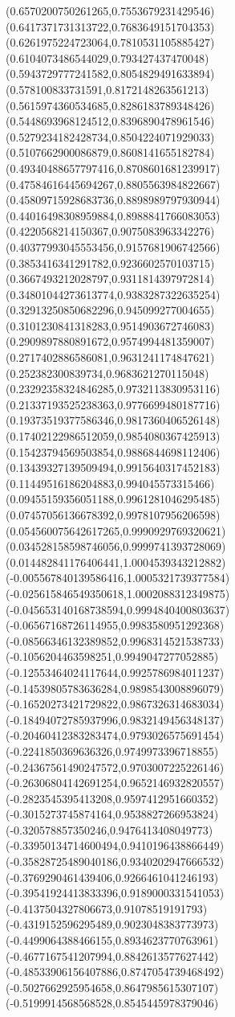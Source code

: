 {(0.6570200750261265,0.7553679231429546)
(0.6417371731313722,0.7683649151704353)
(0.6261975224723064,0.7810531105885427)
(0.6104073486544029,0.793427437470048)
(0.5943729777241582,0.8054829491633894)
(0.578100833731591,0.8172148263561213)
(0.5615974360534685,0.8286183789348426)
(0.5448693968124512,0.8396890478961546)
(0.5279234182428734,0.8504224071929033)
(0.5107662900086879,0.8608141655182784)
(0.49340488657797416,0.8708601681239917)
(0.47584616445694267,0.8805563984822667)
(0.45809715928683736,0.8898989797930944)
(0.44016498308959884,0.8988841766083053)
(0.4220568214150367,0.9075083963342276)
(0.40377993045553456,0.9157681906742566)
(0.3853416341291782,0.9236602570103715)
(0.3667493212028797,0.9311814397972814)
(0.34801044273613774,0.9383287322635254)
(0.32913250850682296,0.945099277004655)
(0.3101230841318283,0.9514903672746083)
(0.2909897880891672,0.9574994481359007)
(0.2717402886586081,0.9631241174847621)
(0.252382300839734,0.9683621270115048)
(0.23292358324846285,0.9732113830953116)
(0.21337193525238363,0.9776699480187716)
(0.19373519377586346,0.9817360406526148)
(0.17402122986512059,0.9854080367425913)
(0.15423794569503854,0.9886844698112406)
(0.13439327139509494,0.9915640317452183)
(0.11449516186204883,0.994045573315466)
(0.09455159356051188,0.9961281046295485)
(0.07457056136678392,0.9978107956206598)
(0.054560075642617265,0.9990929769320621)
(0.034528158598746056,0.9999741393728069)
(0.014482841176406441,1.0004539343212882)
(-0.005567840139586416,1.0005321739377584)
(-0.025615846549350618,1.0002088312349875)
(-0.045653140168738594,0.9994840400803637)
(-0.06567168726114955,0.9983580951292368)
(-0.08566346132389852,0.9968314521538733)
(-0.1056204463598251,0.9949047277052885)
(-0.12553464024117644,0.9925786984011237)
(-0.14539805783636284,0.9898543008896079)
(-0.16520273421729822,0.9867326314683034)
(-0.18494072785937996,0.9832149456348137)
(-0.20460412383283474,0.9793026575691454)
(-0.2241850369636326,0.9749973396718855)
(-0.24367561490247572,0.9703007225226146)
(-0.26306804142691254,0.9652146932820557)
(-0.2823545395413208,0.9597412951660352)
(-0.3015273745874164,0.9538827266953824)
(-0.320578857350246,0.9476413408049773)
(-0.33950134714600494,0.9410196438866449)
(-0.35828725489040186,0.9340202947666532)
(-0.3769290461439406,0.9266461041246193)
(-0.39541924413833396,0.9189000331541053)
(-0.4137504327806673,0.91078519191793)
(-0.4319152596295489,0.9023048383773973)
(-0.4499064388466155,0.8934623770763961)
(-0.4677167541207994,0.8842613577627442)
(-0.48533906156407886,0.8747054739468492)
(-0.5027662925954658,0.8647985615307107)
(-0.5199914568568528,0.8545445978379046)
}
